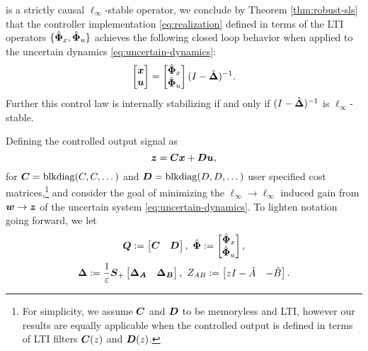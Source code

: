 is a strictly causal $\ell_\infty$-stable operator, we conclude by Theorem \ref{thm:robust-sls} that the controller implementation \eqref{eq:realization} defined in terms of the LTI operators $\{\hat{\boldsymbol{\Phi}}_x,\hat{\boldsymbol{\Phi}}_u\}$ achieves the following closed loop behavior when applied to the uncertain dynamics \eqref{eq:uncertain-dynamics}:
\begin{equation}
\begin{bmatrix}\boldsymbol{x} \\ \boldsymbol{u} \end{bmatrix} = \begin{bmatrix} \hat{\boldsymbol{\Phi}}_x \\ \hat{\boldsymbol{\Phi}}_u \end{bmatrix}(I-\hat{\boldsymbol{\Delta}})^{-1}.
\label{eq:dhat-response}
\end{equation}
Further this control law is internally stabilizing if and only if $(I-\hat{\boldsymbol{\Delta}})^{-1}$ is $\ell_\infty$-stable.  

Defining the controlled output signal as 
\begin{equation}
\boldsymbol{z} = \boldsymbol{C}\boldsymbol{x} + \boldsymbol{D}\boldsymbol{u},
\label{eq:z-output}
\end{equation}
for $\boldsymbol{C} = \mathrm{blkdiag}(C,C,\dots)$ and $\boldsymbol{D} = \mathrm{blkdiag}(D,D,\dots)$ user specified cost matrices,\footnote{For simplicity, we assume $\boldsymbol{C}$ and $\boldsymbol{D}$ to be memoryless and LTI, however our results are equally applicable when the controlled output is defined in terms of LTI  filters $\boldsymbol{C}(z)$ and $\boldsymbol{D}(z)$.} and consider the goal of minimizing the $\ell_\infty\to\ell_\infty$ induced gain from $\boldsymbol{w} \to \boldsymbol{z}$ of the uncertain system \eqref{eq:uncertain-dynamics}.  To lighten notation going forward, we let
\begin{multline}
\boldsymbol{Q} := \begin{bmatrix} \boldsymbol{C} & \boldsymbol{D} \end{bmatrix}, \ \hat{\boldsymbol{\Phi}} := \begin{bmatrix}\hat{\boldsymbol{\Phi}}_x \\ \hat{\boldsymbol{\Phi}}_u \end{bmatrix}, \\ {\boldsymbol{\Delta}} := \frac{1}{\varepsilon}\boldsymbol{S}_+\begin{bmatrix} {\boldsymbol{\Delta}}_{\boldsymbol{A}} & {\boldsymbol{\Delta}}_{\boldsymbol{B}} \end{bmatrix}, \ Z_{AB} := \begin{bmatrix} zI-\hat A & - \hat B\end{bmatrix}.
\label{eq:notation}
\end{multline}


